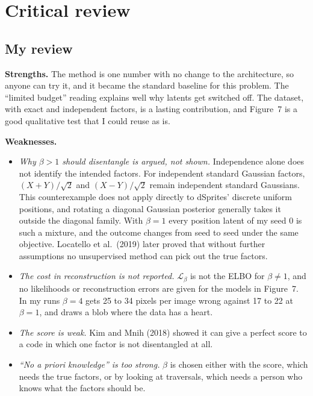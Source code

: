 \section{Critical review}

\subsection{My review}
\textbf{Strengths.} The method is one number with no change to the architecture, so anyone can try it, and it became the standard baseline for this problem. The ``limited budget'' reading explains well why latents get switched off. The dataset, with exact and independent factors, is a lasting contribution, and Figure~7 is a good qualitative test that I could reuse as is.

\textbf{Weaknesses.}
\begin{itemize}
  \item \emph{Why $\beta>1$ should disentangle is argued, not shown.} Independence alone does not identify the intended factors. For independent standard Gaussian factors, $(X+Y)/\sqrt{2}$ and $(X-Y)/\sqrt{2}$ remain independent standard Gaussians. This counterexample does not apply directly to dSprites' discrete uniform positions, and rotating a diagonal Gaussian posterior generally takes it outside the diagonal family. With $\beta=1$ every position latent of my seed 0 is such a mixture, and the outcome changes from seed to seed under the same objective. Locatello et al.\ (2019) later proved that without further assumptions no unsupervised method can pick out the true factors.
  \item \emph{The cost in reconstruction is not reported.} $\mathcal L_\beta$ is not the ELBO for $\beta\ne1$, and no likelihoods or reconstruction errors are given for the models in Figure~7. In my runs $\beta=4$ gets 25 to 34 pixels per image wrong against 17 to 22 at $\beta=1$, and draws a blob where the data has a heart.
  \item \emph{The score is weak.} Kim and Mnih (2018) showed it can give a perfect score to a code in which one factor is not disentangled at all.
  \item \emph{``No a priori knowledge'' is too strong.} $\beta$ is chosen either with the score, which needs the true factors, or by looking at traversals, which needs a person who knows what the factors should be.
\end{itemize}

